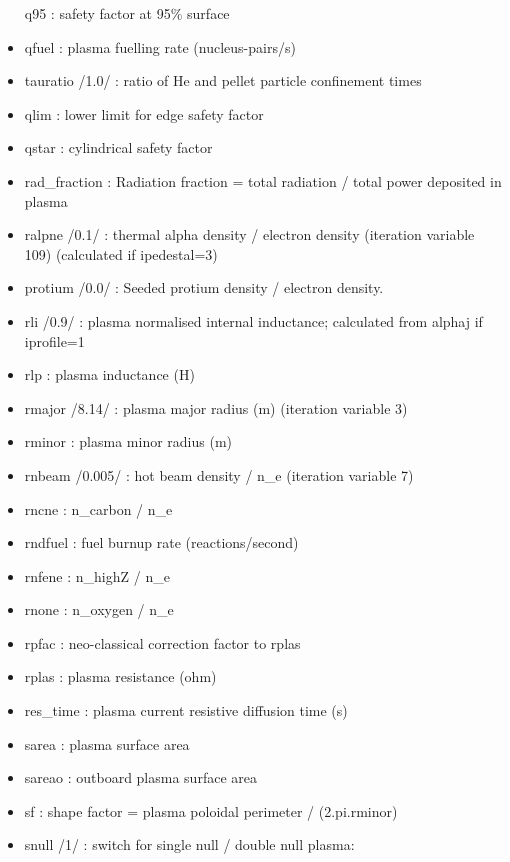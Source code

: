 \documentclass[
]{article}
\begin{document}
\begin{itemize}
  q95 : safety factor at 95\% surface
\item
  qfuel : plasma fuelling rate (nucleus-pairs/s)
\item
  tauratio /1.0/ : ratio of He and pellet particle confinement times
\item
  qlim : lower limit for edge safety factor
\item
  qstar : cylindrical safety factor
\item
  rad\_fraction : Radiation fraction = total radiation / total power
  deposited in plasma
\item
  ralpne /0.1/ : thermal alpha density / electron density (iteration
  variable 109) (calculated if ipedestal=3)
\item
  protium /0.0/ : Seeded protium density / electron density.
\item
  rli /0.9/ : plasma normalised internal inductance; calculated from
  alphaj if iprofile=1
\item
  rlp : plasma inductance (H)
\item
  rmajor /8.14/ : plasma major radius (m) (iteration variable 3)
\item
  rminor : plasma minor radius (m)
\item
  rnbeam /0.005/ : hot beam density / n\_e (iteration variable 7)
\item
  rncne : n\_carbon / n\_e
\item
  rndfuel : fuel burnup rate (reactions/second)
\item
  rnfene : n\_highZ / n\_e
\item
  rnone : n\_oxygen / n\_e
\item
  rpfac : neo-classical correction factor to rplas
\item
  rplas : plasma resistance (ohm)
\item
  res\_time : plasma current resistive diffusion time (s)
\item
  sarea : plasma surface area
\item
  sareao : outboard plasma surface area
\item
  sf : shape factor = plasma poloidal perimeter / (2.pi.rminor)
\item
  snull /1/ : switch for single null / double null plasma:


\end{itemize}
\end{document}
